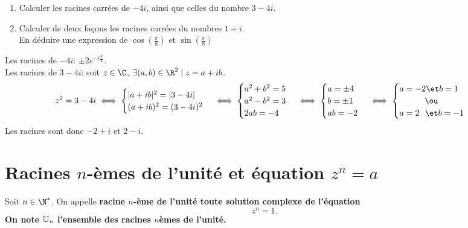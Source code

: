 \documentclass[11pt]{article}
\begin{document}
\begin{ex}{}{}
    \begin{enumerate}
        \item Calculer les racines carrées de $-4i$, ainsi que celles du nombre $3-4i$.
        \item Calculer de deux façons les racines carrées du nombres $1+i$.\\
        En déduire une expression de $\cos\left( \frac{\pi}{8} \right)$ et $\sin\left( \frac{\pi}{8} \right)$ 
    \end{enumerate}
    \tcblower
     Les racines de $-4i$: $\pm 2e^{-i\frac{\pi}{4}}$.\\
    Les racines de $3-4i$: soit $z\in\C$, $\exists(a,b)\in\R^2\mid z=a+ib$.
    \begin{equation*}
        z^2=3-4i\iff \begin{cases}|a+ib|^2=|3-4i|\\ (a+ib)^2 = (3-4i)^2\end{cases}\iff \begin{cases}a^2+b^2=5\\a^2-b^2=3\\2ab = -4\end{cases}\iff \begin{cases}a=\pm4\\b=\pm1\\ab=-2\end{cases}\iff\begin{cases}a=-2 \et b=1\\ \qquad\quad\ou\\a=2~~\et b=-1\end{cases}
    \end{equation*}
    Les racines sont donc $-2+i$ et $2-i$.
\end{ex}

\section{Racines \texorpdfstring{$n$}{Lg}-èmes de l'unité et équation \texorpdfstring{$z^n=a$}{Lg}}

\begin{defi}{}{}
    Soit $n\in\N^*$. On appelle \bf{racine $n$-ème de l'unité} toute solution complexe de l'équation
    \begin{equation*}
        z^n=1.
    \end{equation*}
    On note $\mathbb{U}_n$ l'ensemble des racines $n$èmes de l'unité.
\end{defi}
\end{document}
